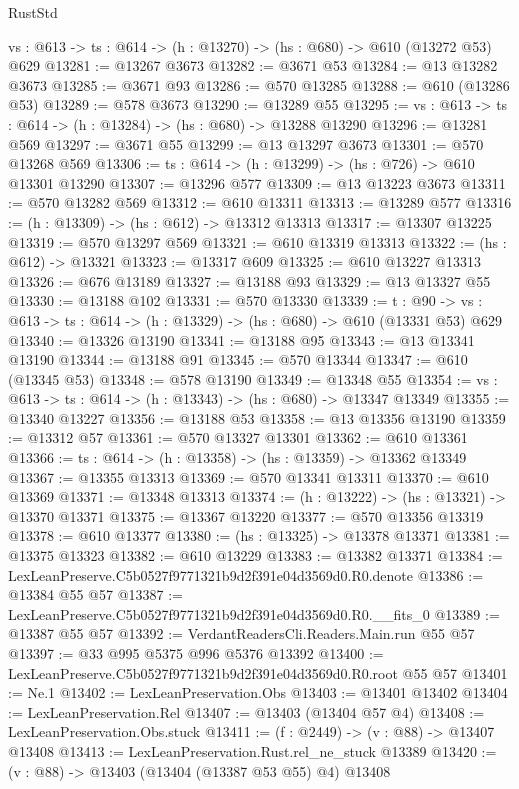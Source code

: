\begin{lexlean}{RustStd}
\begin{coremodule}
  {vs : @613} -> {ts : @614} -> (h : @13270) -> (hs : @680) -> @610 (@13272 @53) @629
@13281 := @13267 @3673
@13282 := @3671 @53
@13284 := @13 @13282 @3673
@13285 := @3671 @93
@13286 := @570 @13285
@13288 := @610 (@13286 @53)
@13289 := @578 @3673
@13290 := @13289 @55
@13295 := {vs : @613} -> {ts : @614} -> (h : @13284) -> (hs : @680) -> @13288 @13290
@13296 := @13281 @569
@13297 := @3671 @55
@13299 := @13 @13297 @3673
@13301 := @570 @13268 @569
@13306 := {ts : @614} -> (h : @13299) -> (hs : @726) -> @610 @13301 @13290
@13307 := @13296 @577
@13309 := @13 @13223 @3673
@13311 := @570 @13282 @569
@13312 := @610 @13311
@13313 := @13289 @577
@13316 := (h : @13309) -> (hs : @612) -> @13312 @13313
@13317 := @13307 @13225
@13319 := @570 @13297 @569
@13321 := @610 @13319 @13313
@13322 := (hs : @612) -> @13321
@13323 := @13317 @609
@13325 := @610 @13227 @13313
@13326 := @676 @13189
@13327 := @13188 @93
@13329 := @13 @13327 @55
@13330 := @13188 @102
@13331 := @570 @13330
@13339 := {t : @90} ->
  {vs : @613} -> {ts : @614} -> (h : @13329) -> (hs : @680) -> @610 (@13331 @53) @629
@13340 := @13326 @13190
@13341 := @13188 @95
@13343 := @13 @13341 @13190
@13344 := @13188 @91
@13345 := @570 @13344
@13347 := @610 (@13345 @53)
@13348 := @578 @13190
@13349 := @13348 @55
@13354 := {vs : @613} -> {ts : @614} -> (h : @13343) -> (hs : @680) -> @13347 @13349
@13355 := @13340 @13227
@13356 := @13188 @53
@13358 := @13 @13356 @13190
@13359 := @13312 @57
@13361 := @570 @13327 @13301
@13362 := @610 @13361
@13366 := {ts : @614} -> (h : @13358) -> (hs : @13359) -> @13362 @13349
@13367 := @13355 @13313
@13369 := @570 @13341 @13311
@13370 := @610 @13369
@13371 := @13348 @13313
@13374 := (h : @13222) -> (hs : @13321) -> @13370 @13371
@13375 := @13367 @13220
@13377 := @570 @13356 @13319
@13378 := @610 @13377
@13380 := (hs : @13325) -> @13378 @13371
@13381 := @13375 @13323
@13382 := @610 @13229
@13383 := @13382 @13371
@13384 := LexLeanPreserve.C5b0527f9771321b9d2f391e04d3569d0.R0.denote
@13386 := @13384 @55 @57
@13387 := LexLeanPreserve.C5b0527f9771321b9d2f391e04d3569d0.R0.__fits_0
@13389 := @13387 @55 @57
@13392 := VerdantReadersCli.Readers.Main.run @55 @57
@13397 := @33 @995 @5375 @996 @5376 @13392
@13400 := LexLeanPreserve.C5b0527f9771321b9d2f391e04d3569d0.R0.root @55 @57
@13401 := Ne.{1}
@13402 := LexLeanPreservation.Obs
@13403 := @13401 @13402
@13404 := LexLeanPreservation.Rel
@13407 := @13403 (@13404 @57 @4)
@13408 := LexLeanPreservation.Obs.stuck
@13411 := (f : @2449) -> (v : @88) -> @13407 @13408
@13413 := LexLeanPreservation.Rust.rel_ne_stuck @13389
@13420 := (v : @88) -> @13403 (@13404 (@13387 @53 @55) @4) @13408

\end{coremodule}
\end{lexlean}
